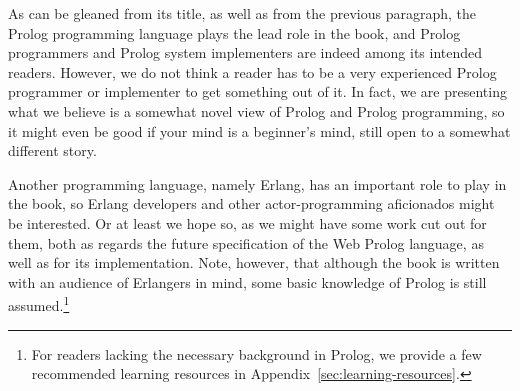 %
%
%
%

As can be gleaned from its title, as well as from the previous paragraph, the Prolog programming language plays the lead role in the book, and Prolog programmers and Prolog system implementers are indeed among its intended readers. However, we do not think a reader has to be a very experienced Prolog programmer or implementer to get something out of it. In fact, we are presenting what we believe is a somewhat novel view of Prolog and Prolog programming, so it might even be good if your mind is a beginner's mind, still open to a somewhat different story.
 
Another programming language, namely Erlang, has an important role to play in the book, so Erlang developers and other actor-programming aficionados might be interested. Or at least we hope so, as we might have some work cut out for them, both as regards the future specification of the Web Prolog language, as well as for its implementation. Note, however, that although the book is written with an audience of Erlangers in mind, some basic knowledge of Prolog is still assumed.\footnote{For readers lacking the necessary background in Prolog, we provide a few recommended learning resources in Appendix~\ref{sec:learning-resources}.}

